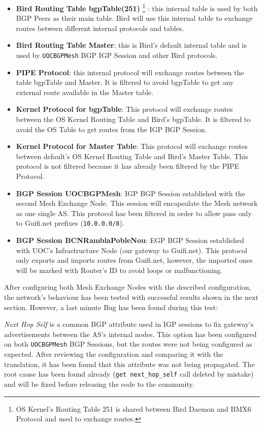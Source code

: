 \begin{itemize}
    \item \textbf{Bird Routing Table bgpTable(251)} \footnote{OS Kernel's Routing Table 251 is shared between Bird Daemon and BMX6 Protocol and used to exchange routes.} : this internal table is used by both BGP Peers as their main table. Bird will use this internal table to exchange routes between different internal protocols and tables.
    \item \textbf{Bird Routing Table Master}: this is Bird's default internal table and is used by \texttt{UOCBGPMesh} BGP IGP Session and other Bird protocols.
    \item \textbf{PIPE Protocol}: this internal protocol will exchange routes between the table bgpTable and Master. It is filtered to avoid bgpTable to get any external route available in the Master table.
    \item \textbf{Kernel Protocol for bgpTable}: This protocol will exchange routes between the OS Kernel Routing Table and Bird's bgpTable. It is filtered to avoid the OS Table to get routes from the IGP BGP Session.
    \item \textbf{Kernel Protocol for Master Table}: This protocol will exchange routes between default's OS Kernel Routing Table and Bird's Master Table. This protocol is not filtered because it has already been filtered by the PIPE Protocol.
    \item \textbf{BGP Session UOCBGPMesh}: IGP BGP Session established with the second Mesh Exchange Node. This session will encapsulate the Mesh network as one single AS. This protocol has been filtered in order to allow pass only to Guifi.net prefixes (\texttt{10.0.0.0/8}).
    \item \textbf{BGP Session BCNRamblaPobleNou}: EGP BGP Session established with UOC's Infrastructure Node (our gateway to Guifi.net). This protocol only exports and imports routes from Guifi.net, however, the imported ones will be marked with Router's ID to avoid loops or malfunctioning.
\end{itemize}

After configuring both Mesh Exchange Nodes with the described configuration, the network's behaviour has been tested with successful results shown in the next section. However, a last minute Bug has been found during this test:

\textit{Next Hop Self} is a common BGP attribute used in IGP sessions to fix gateway's advertisements between the AS's internal nodes. This option has been configured on both \texttt{UOCBGPMesh} BGP Sessions, but the routes were not being configured as expected. After reviewing the configuration and comparing it with the translation, it has been found that this attribute was not being propagated. The root cause has been found already (\texttt{get next\_hop\_self} call deleted by mistake) and will be fixed before releasing the code to the community.



